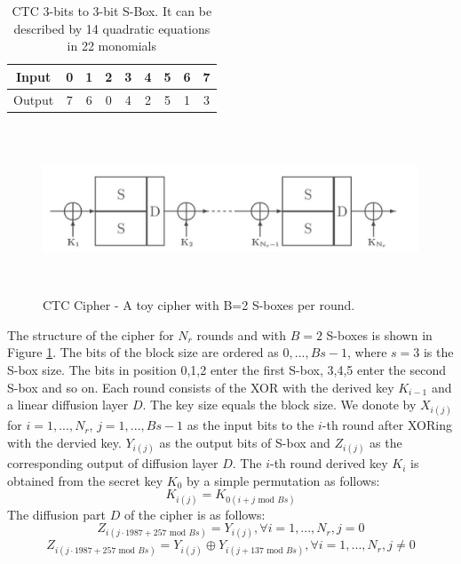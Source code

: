 \begin{table}[!h]
	\centering
	\caption[CTC S-Box]{CTC 3-bits to 3-bit S-Box. It can be described by 14 quadratic equations in 22 monomials \cite{FastAlg}}
	\label{tab:CTCSBox}
	\begin{tabular}{|c|c c c c c c c c|}
		\hline
		Input & 0 & 1 & 2 & 3 & 4 & 5 & 6 & 7   \\ \hline
	    Output & 7 & 6 & 0 & 4 & 2 & 5 & 1 & 3   \\ \hline
	\end{tabular}
\end{table}


\begin{figure}[h!]
	\centering
	\includegraphics[width=150mm,height=50mm]{./pics/CTC_round_function.png}
	\caption[CTC Cipher]{CTC Cipher - A toy cipher with B=2 S-boxes per round.}
	\label{Fig:CTCRound}
\end{figure}

The structure of the cipher for $N_r$ rounds and with $B=2$ S-boxes is shown in Figure \ref{Fig:CTCRound}. The bits of the block size are ordered as $0,...,Bs-1$, where $s=3$ is the S-box size. The bits in position 0,1,2 enter the first S-box, 3,4,5 enter the second S-box and so on. Each round consists of the XOR with the derived key $K_{i-1}$ and a linear diffusion layer $D$. The key size equals the block size. We donote by $X_{i(j)}$ for $i = 1, ... , N_r$, $j = 1, ... , Bs-1$ as the input bits to the $i$-th round after XORing with the dervied key. $Y_{i(j)}$ as the output bits of S-box and $Z_{i(j)}$ as the corresponding output of diffusion layer $D$. The $i$-th round derived key $K_i$ is obtained from the secret key $K_0$ by a simple permutation as follows:
\begin{equation}
K_{i(j)} = K_{0(i+j \text{ mod } Bs)}
\end{equation}
The diffusion part $D$ of the cipher is as follows:
\begin{equation}
Z_{i(j \cdot 1987 + 257 \text{ mod } Bs)} = Y_{i(j)}, \forall i = 1,...,N_{r}, j=0
\end{equation}
\begin{equation}
Z_{i(j \cdot 1987 + 257 \text{ mod } Bs)} = Y_{i(j)} \oplus Y_{i(j+137 \text{ mod } Bs)} , \forall i = 1,...,N_{r}, j \neq 0
\end{equation}

